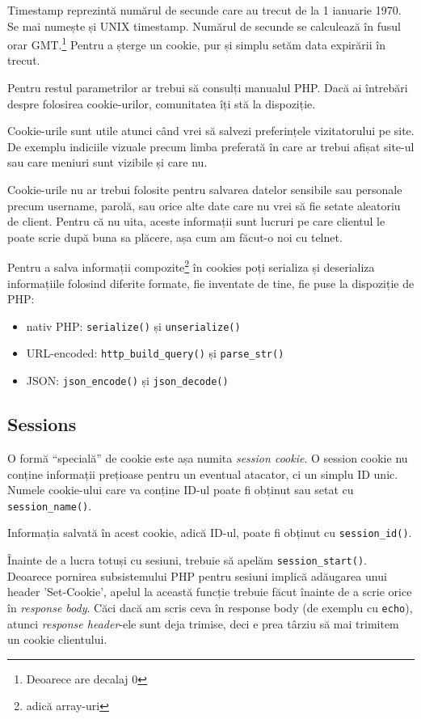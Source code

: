 Timestamp reprezintă numărul de secunde care au trecut de la 1 ianuarie 1970. Se mai numește
și UNIX timestamp. Numărul de secunde se calculează \^in fusul orar GMT.\footnote{Deoarece
are decalaj 0} Pentru a șterge un cookie, pur și simplu setăm data expirării \^in trecut.

Pentru restul parametrilor ar trebui să consulți manualul PHP. Dacă ai \^intrebări
despre folosirea cookie-urilor, comunitatea {\phpro} \^iți stă la dispoziție.

Cookie-urile sunt utile atunci c\^and vrei să salvezi preferințele vizitatorului
pe site. De exemplu indiciile vizuale precum limba preferată \^in care ar
trebui afișat site-ul sau care meniuri sunt vizibile și care nu.

Cookie-urile nu ar trebui folosite pentru salvarea datelor sensibile sau personale
precum username, parolă, sau orice alte date care nu vrei să fie setate aleatoriu
de client. Pentru că nu uita, aceste informații sunt lucruri pe care
clientul le poate scrie după buna sa plăcere, așa cum am făcut-o noi cu telnet.

Pentru a salva informații compozite\footnote{adică array-uri} \^in cookies
poți serializa
și deserializa informațiile folosind diferite formate, fie inventate de tine,
fie puse la dispoziție de PHP:
\begin{itemize}
 \item nativ PHP: \texttt{serialize()} și \texttt{unserialize()}
 \item URL-encoded: \texttt{http\_build\_query()} și \texttt{parse\_str()}
 \item JSON: \texttt{json\_encode()} și \texttt{json\_decode()}
\end{itemize}


\subsection{Sessions}
O formă ``specială'' de cookie este așa numita \textsl{session cookie}.
O session cookie nu conține informații prețioase pentru un eventual atacator,
ci un simplu ID unic. Numele cookie-ului care va conține ID-ul poate fi
obținut sau setat cu \texttt{session\_name()}.

Informația salvată \^in acest cookie, adică ID-ul, poate fi obținut cu
\texttt{session\_id()}.

\^Inainte de a lucra totuși cu sesiuni, trebuie să apelăm \texttt{session\_start()}.
Deoarece pornirea subsistemului PHP pentru sesiuni implică adăugarea unui header
'Set-Cookie', apelul la această funcție trebuie făcut \^inainte de a scrie orice
\^in \textit{response body}. Căci dacă am scris ceva \^in response body (de exemplu
cu \texttt{echo}), atunci \textit{response header}-ele sunt deja trimise, deci
e prea târziu să mai trimitem un cookie clientului.

